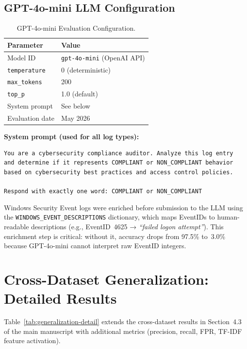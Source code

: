 \documentclass[11pt,a4paper]{article}
\begin{document}
\subsection{GPT-4o-mini LLM Configuration}

\begin{table}[ht]
\centering
\caption{GPT-4o-mini Evaluation Configuration.}
\label{tab:llm-config}
\begin{tabular}{ll}
\toprule
\textbf{Parameter} & \textbf{Value} \\
\midrule
Model ID            & \texttt{gpt-4o-mini} (OpenAI API) \\
\texttt{temperature} & 0 (deterministic) \\
\texttt{max\_tokens} & 200 \\
\texttt{top\_p}      & 1.0 (default) \\
System prompt       & See below \\
Evaluation date     & May 2026 \\
\bottomrule
\end{tabular}
\end{table}

\noindent\textbf{System prompt (used for all log types):}
\begin{verbatim}
You are a cybersecurity compliance auditor. Analyze this log entry
and determine if it represents COMPLIANT or NON_COMPLIANT behavior
based on cybersecurity best practices and access control policies.

Respond with exactly one word: COMPLIANT or NON_COMPLIANT
\end{verbatim}

\noindent Windows Security Event logs were enriched before submission to the LLM using the
\texttt{WINDOWS\_EVENT\_DESCRIPTIONS} dictionary, which maps EventIDs to human-readable
descriptions (e.g., EventID~4625 → \textit{``failed logon attempt''}). This enrichment step
is critical: without it, accuracy drops from 97.5\% to~3.0\% because GPT-4o-mini cannot
interpret raw EventID integers.

\section{Cross-Dataset Generalization: Detailed Results}
\label{sec:generalization-detail}

Table~\ref{tab:generalization-detail} extends the cross-dataset results in Section~4.3 of the
main manuscript with additional metrics (precision, recall, FPR, TF-IDF feature activation).
\end{document}
